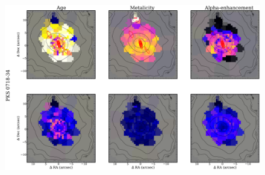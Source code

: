 	\begin{figure}
		\centering
		\includegraphics[height=0.31\textheight]{chapter4/vimos/pop4.png}
	\end{figure}

